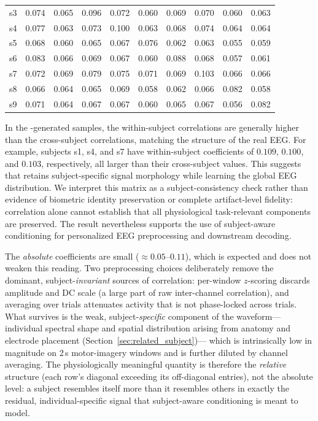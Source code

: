 \begin{table}[t]
\begin{tabular}{c*{9}{c}}
    s3 & 0.074 & 0.065 & 0.096 & 0.072 & 0.060 & 0.069 & 0.070 & 0.060 & 0.063 \\
    s4 & 0.077 & 0.063 & 0.073 & 0.100 & 0.063 & 0.068 & 0.074 & 0.064 & 0.064 \\
    s5 & 0.068 & 0.060 & 0.065 & 0.067 & 0.076 & 0.062 & 0.063 & 0.055 & 0.059 \\
    s6 & 0.083 & 0.066 & 0.069 & 0.067 & 0.060 & 0.088 & 0.068 & 0.057 & 0.061 \\
    s7 & 0.072 & 0.069 & 0.079 & 0.075 & 0.071 & 0.069 & 0.103 & 0.066 & 0.066 \\
    s8 & 0.066 & 0.064 & 0.065 & 0.069 & 0.058 & 0.062 & 0.066 & 0.082 & 0.058 \\
    s9 & 0.071 & 0.064 & 0.067 & 0.067 & 0.060 & 0.065 & 0.067 & 0.056 & 0.082 \\
    \bottomrule
  \end{tabular}
\end{table}

In the \saddpm{}-generated samples, the within-subject correlations are
generally higher than the cross-subject correlations, matching the structure of
the real EEG. For example, subjects s1, s4, and s7 have within-subject
coefficients of $0.109$, $0.100$, and $0.103$, respectively, all larger than
their cross-subject values. This suggests that \saddpm{} retains subject-specific
signal morphology while learning the global EEG distribution. We interpret this
matrix as a subject-consistency check rather than evidence of biometric identity
preservation or complete artifact-level fidelity: correlation alone cannot
establish that all physiological task-relevant components are preserved. The
result nevertheless supports the use of subject-aware conditioning for
personalized EEG preprocessing and downstream decoding.

The \emph{absolute} coefficients are small ($\approx 0.05$--$0.11$), which is
expected and does not weaken this reading. Two preprocessing choices deliberately
remove the dominant, subject-\emph{invariant} sources of correlation: per-window
$z$-scoring discards amplitude and DC scale (a large part of raw inter-channel
correlation), and averaging over trials attenuates activity that is not
phase-locked across trials. What survives is the weak, subject-\emph{specific}
component of the waveform---individual spectral shape and spatial distribution
arising from anatomy and electrode placement (Section~\ref{sec:related_subject})---
which is intrinsically low in magnitude on 2\,s motor-imagery windows and is
further diluted by channel averaging. The physiologically meaningful quantity is
therefore the \emph{relative} structure (each row's diagonal exceeding its
off-diagonal entries), not the absolute level: a subject resembles itself more
than it resembles others in exactly the residual, individual-specific signal that
subject-aware conditioning is meant to model.

